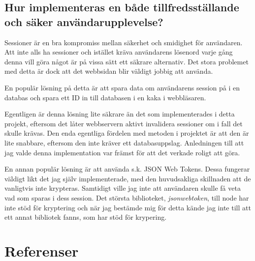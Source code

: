 \documentclass{article}
\begin{document}
\subsection{
	Hur implementeras en både tillfredsställande och säker användarupplevelse?
}

Sessioner är en bra kompromiss mellan säkerhet och smidighet för användaren. Att
inte alls ha sessioner och istället kräva användarens lösenord varje gång denna
vill göra något är på vissa sätt ett säkrare alternativ. Det stora problemet med
detta är dock att det webbsidan blir väldigt jobbig att använda.

En populär lösning på detta är att spara data om användarens session på i en
databas och spara ett ID in till databasen i en kaka i webbläsaren.

Egentligen är denna lösning lite säkrare än det som implementerades i detta
projekt, eftersom det låter webbservern aktivt invalidera sessioner om i fall
det skulle krävas. Den enda egentliga fördelen med metoden i projektet är att
den är lite snabbare, eftersom den inte kräver ett databasuppslag. Anledningen
till att jag valde denna implementation var främst för att det verkade roligt
att göra.

En annan populär lösning är att använda s.k. JSON Web Tokens. Dessa fungerar
väldigt likt det jag själv implementerade, med den huvudsakliga skillnaden att
de vanligtvis inte krypteras. Samtidigt ville jag inte att användaren skulle få
veta vad som sparas i dess session. Det största biblioteket,
\textit{jsonwebtoken}, till node har inte stöd för kryptering och när jag
bestämde mig för detta kände jag inte till att ett annat bibliotek fanns, som
har stöd för krypering.

\section{Referenser}
\end{document}
